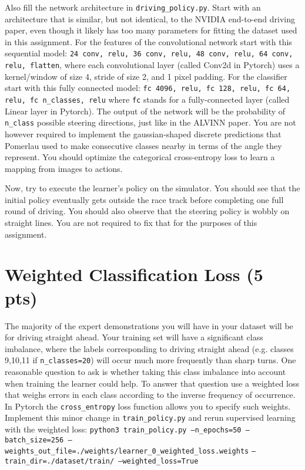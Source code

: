 \documentclass[a4paper,10pt]{article}
\def\code#1{\texttt{#1}}
\begin{document}
\noindent Also fill the network architecture in \code{driving\_policy.py}. Start with an architecture that is similar, but not identical, to the NVIDIA end-to-end driving paper, even though it likely has too many parameters 
for fitting the dataset used in this assignment. For the features of the convolutional network start with this sequential model: \code{24 conv, relu, 36 conv, relu, 48 conv, relu, 64 conv, relu, flatten}, where each 
convolutional layer (called Conv2d in Pytorch) uses a kernel/window of size 4, stride of size 2, and 1 pixel padding. For the classifier start with this fully connected model: \code{fc 4096, relu, fc 128, relu, fc 64, 
relu, fc n\_classes, relu} where \code{fc} stands for a fully-connected layer (called Linear layer in Pytorch). The output of the network will be the probability of \code{n\_class} possible steering directions,
just like in the ALVINN paper. You are not however required to implement the gaussian-shaped discrete predictions that Pomerlau used to make consecutive classes nearby in terms of the angle they represent. 
You should optimize the categorical cross-entropy loss to learn a mapping from images to actions.   
\newline           

\noindent Now, try to execute the learner's policy on the simulator. You should see that the initial policy eventually gets outside the race track before completing one full round of driving. You
should also observe that the steering policy is wobbly on straight lines. You are not required to fix that for the purposes of this assignment. 


\section{Weighted Classification Loss (5 pts)}
The majority of the expert demonstrations you will have in your dataset will be for driving straight ahead. Your training set will have a significant class imbalance, where the labels corresponding to
driving straight ahead (e.g. classes {9,10,11} if \code{n\_classes=20}) will occur much more frequently than sharp turns. One reasonable question to ask is whether taking this class imbalance into account
when training the learner could help. To answer that question use a weighted loss that weighs errors in each class according to the inverse frequency of occurrence. In Pytorch the \code{cross\_entropy} loss 
function allows you to specify such weights. Implement this minor change in \code{train\_policy.py} and rerun supervised learning with the weighted loss: \code{python3  train\_policy.py --n\_epochs=50 
--batch\_size=256 --weights\_out\_file=./weights/learner\_0\_weighted\_loss.weights} \newline \code{--train\_dir=./dataset/train/ --weighted\_loss=True}
\newline
\end{document}
